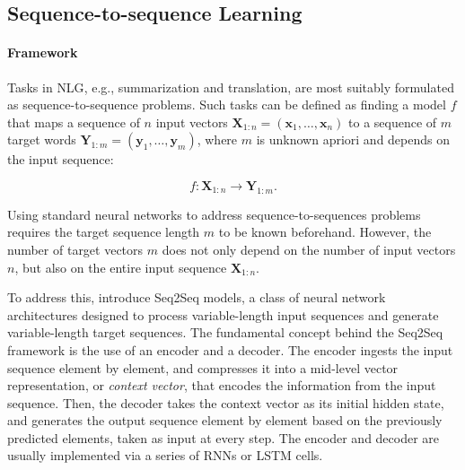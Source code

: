 


\subsection{Sequence-to-sequence Learning}

\paragraph{Framework} Tasks in \ac{NLG}, e.g., summarization and translation, are most suitably formulated as sequence-to-sequence problems. Such tasks can be defined as finding a model $f$ that maps a sequence of $n$ input vectors $\bm{X}_{1:n} = (\bm{x}_1, \ldots, \bm{x}_n)$ to a sequence of $m$ target words $\bm{Y}_{1:m} = (\bm{y}_1, \ldots, \bm{y}_m)$, where $m$ is unknown apriori and depends on the input sequence:

\begin{equation}
    f : \bm{X}_{1:n} \rightarrow \bm{Y}_{1:m}.
\end{equation}

Using standard neural networks to address sequence-to-sequences problems requires the target sequence length $m$ to be known beforehand. However, the number of target vectors $m$ does not only depend on the number of input vectors $n$, but also on the entire input sequence $\bm{X}_{1:n}$. 

To address this, \citet{sutskever2014sequence} introduce \ac{Seq2Seq} models, a class of neural network architectures designed to process variable-length input sequences and generate variable-length target sequences. The fundamental concept behind the \ac{Seq2Seq} framework is the use of an encoder and a decoder. The encoder ingests the input sequence element by element, and compresses it into a mid-level vector representation, or \textit{context vector}, that encodes the information from the input sequence. Then, the decoder takes the context vector as its initial hidden state, and generates the output sequence element by element based on the previously predicted elements, taken as input at every step. The encoder and decoder are usually implemented via a series of \acp{RNN} or \ac{LSTM} cells. 

